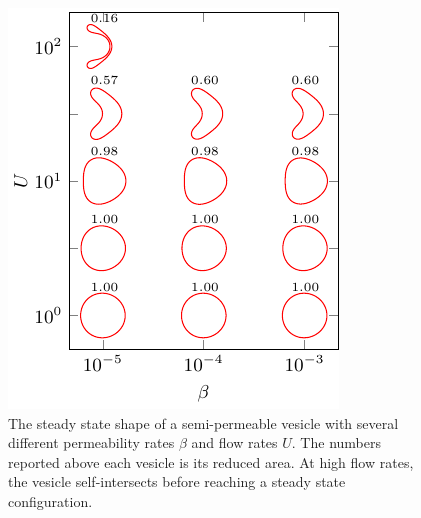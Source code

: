 \documentclass[9pt,twocolumn,twoside,lineno]{pnas-new}
\newif\ifTikz
\begin{document}
\begin{figure}[htp]
%  
  \includegraphics[width=0.9\linewidth]{figures/parabolicPhaseDiagram.pdf}
  \caption{\label{fig:parabolicPhaseDiagram} The steady state shape of a
  semi-permeable vesicle with several different permeability rates
  $\beta$ and flow rates $U$. The numbers reported above each vesicle is
  its reduced area. At high flow rates, the vesicle self-intersects
  before reaching a steady state configuration.}
\end{figure}
\end{document}
